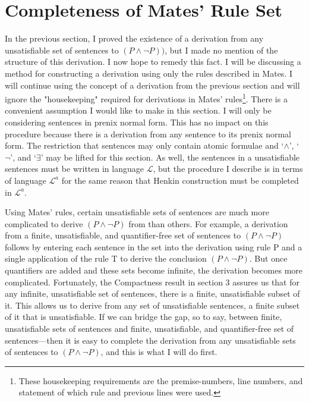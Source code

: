 \documentclass[12pt]{article}
\theoremstyle{definition}
\theoremstyle{remark}
\begin{document}
\maketitle

\section{Completeness of Mates' Rule Set}

In the previous section, I proved the existence of a derivation from any unsatisfiable set of sentences to $(P \land \neg P))$, but I made no mention of the structure of this derivation. I now hope to remedy this fact. I will be discussing a method for constructing a derivation using only the rules described in Mates. I will continue using the concept of a derivation from the previous section and will ignore the "housekeeping" required for derivations in Mates' rules\footnote{These housekeeping requirements are the premise-numbers, line numbers, and statement of which rule and previous lines were used.}. There is a convenient assumption I would like to make in this section. I will only be considering sentences in prenix normal form. This has no impact on this procedure because there is a derivation from any sentence to its prenix normal form. The restriction that sentences may only contain atomic formulae and `$\land$', `$\neg$', and `$\exists$' may be lifted for this section. As well, the sentences in a unsatisfiable sentences must be written in language $\mathscr{L}$, but the procedure I describe is in terms of language $\mathscr{L}^a$ for the same reason that Henkin construction must be completed in $\mathscr{L}^a$.

Using Mates' rules, certain unsatisfiable sets of sentences are much more complicated to derive $(P \land \neg P)$ from than others. For example, a derivation from a finite, unsatisfiable, and quantifier-free set of sentences to $(P \land \neg P)$ follows by entering each sentence in the set into the derivation using rule P and a single application of the rule T to derive the conclusion $(P \land \neg P)$. But once quantifiers are added and these sets become infinite, the derivation becomes more complicated. Fortunately, the Compactness result in section 3 assures us that for any infinite, unsatisfiable set of sentences, there is a finite, unsatisfiable subset of it. This allows us to derive from any set of unsatisfiable sentences, a finite subset of it that is unsatisfiable. If we can bridge the gap, so to say, between finite, unsatisfiable sets of sentences and finite, unsatisfiable, and quantifier-free set of sentences---then it is easy to complete the derivation from any unsatisfiable sets of sentences to $(P \land \neg P)$, and this is what I will do first. 
\end{document}
